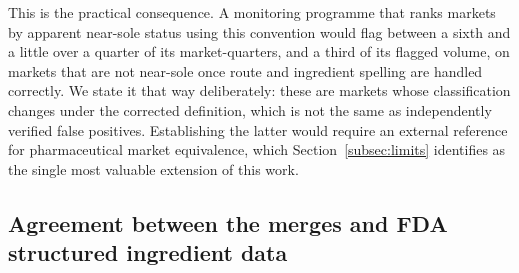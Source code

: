 \documentclass[pdflatex,sn-vancouver-num,Numbered]{sn-jnl}
\begin{document}
This is the practical consequence. A monitoring programme that ranks markets by apparent
near-sole status using this convention would flag between a sixth and a little over a quarter of its
market-quarters, and a third of its flagged volume, on markets that are not near-sole once route
and ingredient spelling are handled correctly. We state it that way deliberately: these are
markets whose classification changes under the corrected definition, which is not the same as
independently verified false positives. Establishing the latter would require an external
reference for pharmaceutical market equivalence, which Section~\ref{subsec:limits} identifies as
the single most valuable extension of this work.

\subsection{Agreement between the merges and FDA structured ingredient data}\label{subsec:validres}
\end{document}
